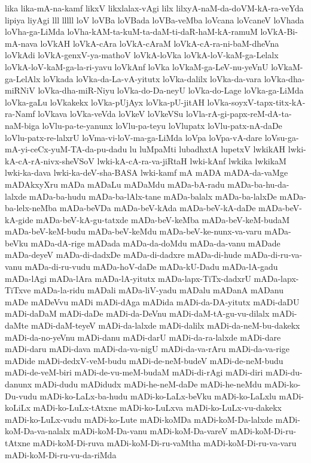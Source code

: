 {lika
lika-mA-na-kamf
likxV
likxlalax-vAgi
lilx
lilxyA-naM-da-doVM-kA-ra-veYda
lipiya
liyAgi
lll
lllll
loV
loVBa
loVBada
loVBa-veMba
loVcana
loVcaneV
loVhada
loVha-ga-LiMda
loVha-kAM-ta-kuM-ta-daM-ti-daR-haM-kA-ramuM
loVkA-Bi-mA-nava
loVkAH
loVkA-cAra
loVkA-cAraM
loVkA-cA-ra-ni-baM-dheVna
loVkAdi
loVkA-genxV-ya-mathoV
loVkA-loVka
loVkA-loV-kaM-ga-Lelalx
loVkA-loV-kaM-ga-la-ri-yavu
loVkAnf
loVka
loVkaM-ga-LeV-nu-yeVnU
loVkaM-ga-LelAlx
loVkada
loVka-da-La-vA-yitutx
loVka-dalilx
loVka-da-vara
loVka-dha-miRNiV
loVka-dha-miR-Niyu
loVka-do-Da-neyU
loVka-do-Lage
loVka-ga-LiMda
loVka-gaLu
loVkakekx
loVka-pUjAyx
loVka-pU-jitAH
loVka-soyxV-tapx-titx-kA-ra-Namf
loVkava
loVka-veVda
loVkeV
loVkeVSu
loVla-rA-gi-papx-reM-dA-ta-naM-biga
loVlu-pa-te-yanunx
loVlu-pa-teyu
loVlupatx
loVlu-patx-nA-daDe
loVlu-patx-re-lalxrU
loVma-vi-loV-ma-ga-LiMda
loVpa
loVpa-vA-dare
loVsu-ga-mA-yi-ceCx-yuM-TA-da-pu-dadu
lu
luMpaMti
lubadhxtA
lupetxV
lwkikAH
lwki-kA-cA-rA-nivx-sheVSoV
lwki-kA-cA-ra-va-jiRtaH
lwki-kAnf
lwkika
lwkikaM
lwki-ka-dava
lwki-ka-deV-sha-BASA
lwki-kamf
mA
mADA
mADA-da-vaMge
mADAkxyXru
mADa
mADaLu
mADaMdu
mADa-bA-radu
mADa-ba-hu-da-lalxde
mADa-ba-hudu
mADa-ba-lAlx-tane
mADa-balalx
mADa-ba-lalxDe
mADa-ba-lelx-neMba
mADa-beVDa
mADa-beV-kAda
mADa-beV-kA-daDe
mADa-beV-kA-gide
mADa-beV-kA-gu-tatxde
mADa-beV-keMba
mADa-beV-keM-budaM
mADa-beV-keM-budu
mADa-beV-keMdu
mADa-beV-ke-nunx-va-varu
mADa-beVku
mADa-dA-rige
mADada
mADa-da-doMdu
mADa-da-vanu
mADade
mADa-deyeV
mADa-di-dadxDe
mADa-di-dadxre
mADa-di-hude
mADa-di-ru-va-vanu
mADa-di-ru-vudu
mADa-hoV-daDe
mADa-kU-Dadu
mADa-lA-gadu
mADa-lAgi
mADa-lAra
mADa-lA-yitutx
mADa-lapx-TiTx-dadxrU
mADa-lapx-TiTxve
mADa-la-ridu
mADali
mADa-liV-yadu
mADalu
mADanA
mADanu
mADe
mADeVvu
mADi
mADi-dAga
mADida
mADi-da-DA-yitutx
mADi-daDU
mADi-daDaM
mADi-daDe
mADi-da-DeVnu
mADi-daM-tA-gu-vu-dilalx
mADi-daMte
mADi-daM-teyeV
mADi-da-lalxde
mADi-dalilx
mADi-da-neM-bu-dakekx
mADi-da-no-yeVnu
mADi-danu
mADi-darU
mADi-da-ra-lalxde
mADi-dare
mADi-daru
mADi-dava
mADi-da-va-nigU
mADi-da-va-rAru
mADi-da-va-rige
mADide
mADi-dedxV-veM-budu
mADi-de-neM-budeV
mADi-de-neM-budu
mADi-de-veM-biri
mADi-de-vu-meM-budaM
mADi-di-rAgi
mADi-diri
mADi-du-danunx
mADi-dudu
mADidudx
mADi-he-neM-daDe
mADi-he-neMdu
mADi-ko-Du-vudu
mADi-ko-LaLx-ba-hudu
mADi-ko-LaLx-beVku
mADi-ko-LaLxlu
mADi-koLiLx
mADi-ko-LuLx-tAtxne
mADi-ko-LuLxva
mADi-ko-LuLx-vu-dakekx
mADi-ko-LuLx-vudu
mADi-ko-Lute
mADi-koMDa
mADi-koM-Da-lalxde
mADi-koM-Da-va-nalalx
mADi-koM-Da-vanu
mADi-koM-Da-vareV
mADi-koM-Di-ru-tAtxne
mADi-koM-Di-ruva
mADi-koM-Di-ru-vaMtha
mADi-koM-Di-ru-va-varu
mADi-koM-Di-ru-vu-da-riMda
}
